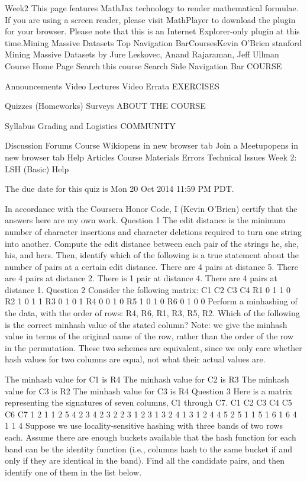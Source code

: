 Week2
This page features MathJax technology to render mathematical formulae. If you are using a screen reader, please visit MathPlayer to download the plugin for your browser. Please note that this is an Internet Explorer-only plugin at this time.Mining Massive Datasets
Top Navigation BarCoursesKevin O'Brien
stanford
Mining Massive Datasets
by Jure Leskovec, Anand Rajaraman, Jeff Ullman
Course Home Page
Search this course Search
Side Navigation Bar
COURSE

Announcements
Video Lectures
Video Errata
EXERCISES

Quizzes (Homeworks)
Surveys
ABOUT THE COURSE

Syllabus
Grading and Logistics
COMMUNITY

Discussion Forums
Course Wikiopens in new browser tab
Join a Meetupopens in new browser tab
Help Articles
Course Materials Errors
Technical Issues
Week 2: LSH (Basic) Help

The due date for this quiz is Mon 20 Oct 2014 11:59 PM PDT.

In accordance with the Coursera Honor Code, I (Kevin O'Brien) certify that the answers here are my own work.
Question 1
The edit distance is the minimum number of character insertions and character deletions required to turn one string into another. Compute the edit distance between each pair of the strings he, she, his, and hers. Then, identify which of the following is a true statement about the number of pairs at a certain edit distance.
There are 4 pairs at distance 5.
There are 4 pairs at distance 2.
There is 1 pair at distance 4.
There are 4 pairs at distance 1.
Question 2
Consider the following matrix:
C1	C2	C3	C4
R1	0	1	1	0
R2	1	0	1	1
R3	0	1	0	1
R4	0	0	1	0
R5	1	0	1	0
R6	0	1	0	0
Perform a minhashing of the data, with the order of rows: R4, R6, R1, R3, R5, R2. Which of the following is the correct minhash value of the stated column? Note: we give the minhash value in terms of the original name of the row, rather than the order of the row in the permutation. These two schemes are equivalent, since we only care whether hash values for two columns are equal, not what their actual values are.

The minhash value for C1 is R4
The minhash value for C2 is R3
The minhash value for C3 is R2
The minhash value for C3 is R4
Question 3
Here is a matrix representing the signatures of seven columns, C1 through C7.
C1	C2	C3	C4	C5	C6	C7
1	2	1	1	2	5	4
2	3	4	2	3	2	2
3	1	2	3	1	3	2
4	1	3	1	2	4	4
5	2	5	1	1	5	1
6	1	6	4	1	1	4
Suppose we use locality-sensitive hashing with three bands of two rows each. Assume there are enough buckets available that the hash function for each band can be the identity function (i.e., columns hash to the same bucket if and only if they are identical in the band). Find all the candidate pairs, and then identify one of them in the list below.

